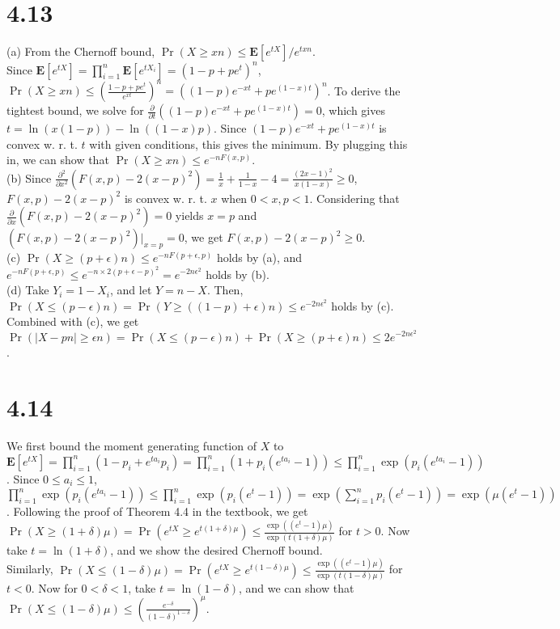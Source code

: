 \documentclass{article}
\begin{document}
\section*{4.13}
(a) From the Chernoff bound, $\Pr(X\geq xn) \leq \textbf{E}[e^{tX}]/e^{txn}$.\\
Since $\textbf{E}[e^{tX}]=\prod\limits_{i=1}^n\textbf{E}[e^{tX_i}]=(1-p+pe^t)^n$, $\Pr(X\geq xn) \leq \left( \frac{1-p+pe^t}{e^{xt}}\right)^n=((1-p)e^{-xt}+pe^{(1-x)t})^n$.
To derive the tightest bound, we solve for $\frac{\partial}{\partial t} ((1-p)e^{-xt}+pe^{(1-x)t})=0$, which gives $t=\ln(x(1-p))-\ln((1-x)p)$.
Since $(1-p)e^{-xt}+pe^{(1-x)t}$ is convex w. r. t. $t$ with given conditions, this gives the minimum.
By plugging this in, we can show that $\Pr(X\geq xn) \leq e^{-nF(x,p)}$.\\
(b) Since $\frac{\partial^2}{\partial x^2} (F(x,p)-2(x-p)^2)=\frac{1}{x}+\frac{1}{1-x}-4=\frac{(2x-1)^2}{x(1-x)}\geq 0$, $F(x,p)-2(x-p)^2$ is convex w. r. t. $x$ when $0<x,p<1$.
Considering that $\frac{\partial}{\partial x}(F(x,p)-2(x-p)^2)=0$ yields $x=p$ and $(F(x,p)-2(x-p)^2) \Big|_{x=p}=0$, we get $F(x,p)-2(x-p)^2 \geq 0$.\\
(c) $\Pr(X\geq(p+\epsilon)n)\leq e^{-nF(p+\epsilon,p)}$ holds by (a), and $e^{-nF(p+\epsilon,p)} \leq e^{-n\times 2(p+\epsilon-p)^2}=e^{-2n\epsilon^2}$ holds by (b).\\
(d) Take $Y_i=1-X_i$, and let $Y=n-X$. Then, $\Pr(X\leq (p-\epsilon)n)=\Pr(Y\geq((1-p)+\epsilon)n)\leq e^{-2n\epsilon^2}$ holds by (c).
Combined with (c), we get $\Pr(|X-pn|\geq \epsilon n)=\Pr(X\leq(p-\epsilon)n)+\Pr(X\geq(p+\epsilon)n)\leq 2e^{-2n\epsilon^2}$.
\section*{4.14}
We first bound the moment generating function of $X$ to $\textbf{E}[e^{tX}]=\prod\limits_{i=1}^n(1-p_i+e^{ta_i}p_i)=\prod\limits_{i=1}^n(1+p_i(e^{ta_i}-1))\leq\prod\limits_{i=1}^n\exp(p_i(e^{ta_i}-1))$.
Since $0 \leq a_i \leq 1$, $\prod\limits_{i=1}^n\exp(p_i(e^{ta_i}-1))\leq\prod\limits_{i=1}^n\exp(p_i(e^t-1))=\exp(\sum\limits_{i=1}^np_i(e^t-1))=\exp(\mu(e^t-1))$.
Following the proof of Theorem 4.4 in the textbook, we get $\Pr(X\geq (1+\delta)\mu)=\Pr(e^{tX}\geq e^{t(1+\delta)\mu})\leq \frac{\exp((e^t-1)\mu)}{\exp(t(1+\delta)\mu)}$ for $t>0$.
Now take $t=\ln(1+\delta)$, and we show the desired Chernoff bound.\\
Similarly, $\Pr(X\leq (1-\delta)\mu)=\Pr(e^{tX}\geq e^{t(1-\delta)\mu})\leq\frac{\exp((e^t-1)\mu)}{\exp(t(1-\delta)\mu)}$ for $t<0$.
Now for $0<\delta<1$, take $t=\ln(1-\delta)$, and we can show that $\Pr(X\leq (1-\delta)\mu)\leq\left(\frac{e^{-\delta}}{(1-\delta)^{1-\delta}}\right)^\mu$.
\end{document}
